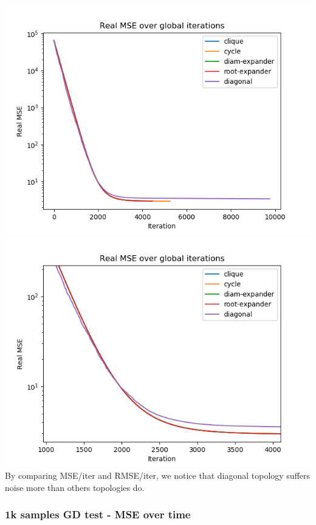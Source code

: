 \documentclass[11pt]{article}
\makeatletter
\def\maxwidth{\ifdim\Gin@nat@width>\linewidth\linewidth
    \else\Gin@nat@width\fi}
\let\Oldincludegraphics\includegraphics
\renewcommand{\includegraphics}[1]{\Oldincludegraphics[width=.8\maxwidth]{#1}}
\makeatother
\begin{document}
\includegraphics{media/img/tests/test_003_1ksamples_classic/2_real-mse_iter.png}
\includegraphics{media/img/tests/test_003_1ksamples_classic/2_real-mse_iter_zoom.png}
By comparing MSE/iter and RMSE/iter, we notice that diagonal topology
suffers noise more than others topologies do.

    \subsubsection{1k samples GD test - MSE over
time}\label{k-samples-gd-test---mse-over-time}
\end{document}
